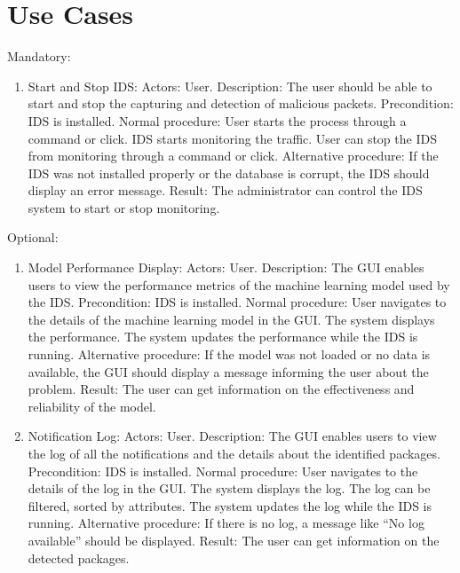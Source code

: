 \documentclass[oneside, english]{reports/assets/sdqtechreport}
\begin{document}
\chapter{Use Cases}
\label{chap:UseCases}
Mandatory:
\begin{enumerate}
    \item Start and Stop IDS:
Actors: User.
Description: The user should be able to start and stop the capturing and detection of malicious packets.
Precondition: IDS is installed.
Normal procedure: User starts the process through a command or click.
IDS starts monitoring the traffic.
User can stop the IDS from monitoring through a command or click.
Alternative procedure: If the IDS was not installed properly or the database is corrupt, the IDS should display an error message.
Result: The administrator can control the IDS system to start or stop monitoring.
\end{enumerate}
Optional:
\begin{enumerate}
    \item Model Performance Display:
Actors: User.
Description: The GUI enables users to view the performance metrics of the machine learning model used by the IDS.
Precondition: IDS is installed.
Normal procedure: User navigates to the details of the machine learning model in the GUI.
The system displays the performance.
The system updates the performance while the IDS is running.
Alternative procedure: If the model was not loaded or no data is available, the GUI should display a message informing the user about the problem.
Result: The user can get information on the effectiveness and reliability of the model.
    \item Notification Log:
Actors: User.
Description: The GUI enables users to view the log of all the notifications and the details about the identified packages.
Precondition: IDS is installed.
Normal procedure: User navigates to the details of the log in the GUI.
The system displays the log.
The log can be filtered, sorted by attributes.
The system updates the log while the IDS is running.
Alternative procedure: If there is no log, a message like “No log available” should be displayed.
Result: The user can get information on the detected packages.
\end{enumerate}
\end{document}
